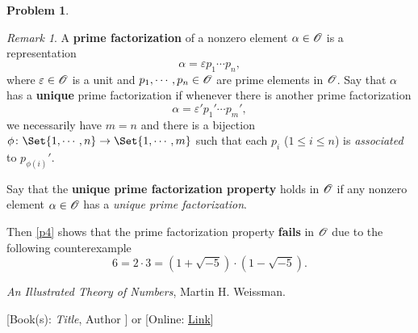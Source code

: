 \documentclass[11pt]{article}
\theoremstyle{plain}
\theoremstyle{definition}
\newtheorem{problem}{Problem}
\theoremstyle{remark}
\newtheorem*{remark}{Remark}
\numberwithin{equation}{problem}
\begin{document}
\begin{problem}
\begin{listinprob}
	\end{listinprob}
	\begin{remark}
		A \textbf{prime factorization} of a nonzero element $\alpha\in\mathscr{O}$ is a representation
		\[
			\alpha = \varepsilon p_1\cdots p_n,	
		\]
		where $\varepsilon\in\mathscr{O}$ is a unit and $p_1,\cdots,p_n\in\mathscr{O}$ are prime elements in $\mathscr{O}$. 
		Say that $\alpha$ has a \textbf{unique} prime factorization if whenever there is another prime factorization
		\[
			\alpha = \varepsilon' p_1'\cdots p_m', 
		\]
		we necessarily have $m=n$ and there is a bijection $\phi\colon\Set{1,\cdots,n}\to\Set{1,\cdots,m}$ such that each $p_i$ ($1\le i\le n$) is \emph{associated} to $p_{\phi(i)}'$.

		Say that the \textbf{unique prime factorization property} holds in $\mathscr{O}$ if any nonzero element $\alpha\in\mathscr{O}$ has a \emph{unique prime factorization}. 

		Then \cref{p4} shows that the prime factorization property \textbf{fails} in $\mathscr{O}$ due to the following counterexample
		\[
			6 = 2\cdot 3 = (1+\sqrt{-5})\cdot(1-\sqrt{-5}).
		\]
	\end{remark}
\end{problem}


\begin{thebibliography}{9}  %
\emph{An Illustrated Theory of Numbers}, Martin H. Weissman.

[Book(s): \emph{Title}, Author ] or [Online: \href{http://example.com/}{Link}]
\end{thebibliography}  %
\end{document}
